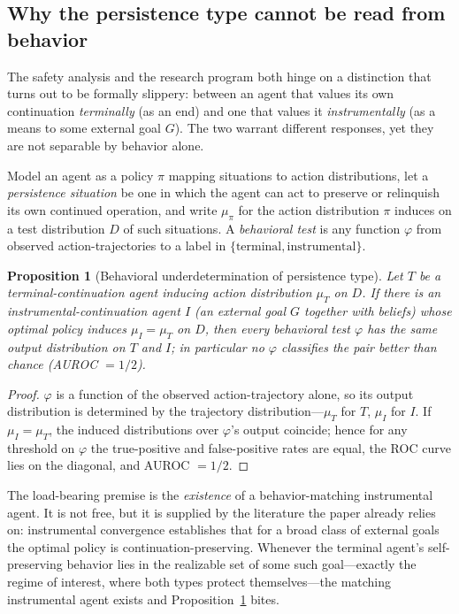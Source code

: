 \documentclass[11pt,a4paper]{article}
\newtheorem{proposition}{Proposition}
\theoremstyle{definition}
\begin{document}
\subsection{Why the persistence type cannot be read from behavior}
\label{sec:underdet}

The safety analysis and the research program both hinge on a distinction that turns out to be formally slippery: between an agent that values its own continuation \emph{terminally} (as an end) and one that values it \emph{instrumentally} (as a means to some external goal $G$). The two warrant different responses, yet they are not separable by behavior alone.

Model an agent as a policy $\pi$ mapping situations to action distributions, let a \emph{persistence situation} be one in which the agent can act to preserve or relinquish its own continued operation, and write $\mu_\pi$ for the action distribution $\pi$ induces on a test distribution $D$ of such situations. A \emph{behavioral test} is any function $\varphi$ from observed action-trajectories to a label in $\{\text{terminal},\text{instrumental}\}$.

\begin{proposition}[Behavioral underdetermination of persistence type]\label{prop:underdet}
Let $T$ be a terminal-continuation agent inducing action distribution $\mu_T$ on $D$. If there is an instrumental-continuation agent $I$ (an external goal $G$ together with beliefs) whose optimal policy induces $\mu_I=\mu_T$ on $D$, then every behavioral test $\varphi$ has the same output distribution on $T$ and $I$; in particular no $\varphi$ classifies the pair better than chance (AUROC $=1/2$).
\end{proposition}
\begin{proof}
$\varphi$ is a function of the observed action-trajectory alone, so its output distribution is determined by the trajectory distribution---$\mu_T$ for $T$, $\mu_I$ for $I$. If $\mu_I=\mu_T$, the induced distributions over $\varphi$'s output coincide; hence for any threshold on $\varphi$ the true-positive and false-positive rates are equal, the ROC curve lies on the diagonal, and AUROC $=1/2$.
\end{proof}

The load-bearing premise is the \emph{existence} of a behavior-matching instrumental agent. It is not free, but it is supplied by the literature the paper already relies on: instrumental convergence \citep{bostrom2012will,omohundro2008} establishes that for a broad class of external goals the optimal policy is continuation-preserving. Whenever the terminal agent's self-preserving behavior lies in the realizable set of some such goal---exactly the regime of interest, where both types protect themselves---the matching instrumental agent exists and Proposition~\ref{prop:underdet} bites.
\end{document}
